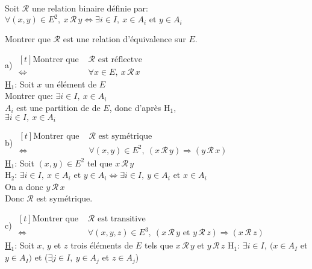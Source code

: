 \documentclass[12pt,twoside,a4paper]{article}
\begin{document}
		\begin{preuve}
			Soit $\mathcal{R}$ une relation binaire d\'efinie par:\\
			$\forall(x,y)\in E^2,\ x\,\mathcal{R}\,y\iff\exists i\in I,\ x\in A_i\text{ et }y\in A_i$
			\begin{liste}
				\item[\cercle{1}] Montrer que $\mathcal{R}$ est une relation d'\'equivalence sur $E$.\\
				\begin{liste}
					\item[a)] $\begin{aligned}[t]\text{Montrer que }&\mathcal{R}\text{ est r\'eflectve}\\
						\iff&\forall x\in E,\ x\,\mathcal{R}\,x\end{aligned}$\\
						\underline{H$_1$}: Soit $x$ un \'el\'ement de $E$\\
						Montrer que: $\exists i\in I,\ x\in A_i$\\
						$A_i$ est une partition de de $E$, donc d'apr\`es H$_1$,\\
						$\exists i\in I,\ x\in A_i$
					\item[b)]  $\begin{aligned}[t]\text{Montrer que }&\mathcal{R}\text{ est sym\'etrique}\\
						\iff&\forall (x,y)\in E^2,\ (x\,\mathcal{R}\,y)\Rightarrow(y\,\mathcal{R}\,x)\end{aligned}$\\
						\underline{H$_1$}: Soit $(x,y)\in E^2$ tel que $x\,\mathcal{R}\,y$\\
						H$_2$: $\exists i\in I,\ x\in A_i\text{ et }y\in A_i\iff\exists i\in I,\ y\in A_i \text{ et } x\in A_i$\\
						On a donc $y\,\mathcal{R}\,x$\\
						Donc $\mathcal{R}$ est sym\'etrique.
					\item[c)] $\begin{aligned}[t]\text{Montrer que }&\mathcal{R}\text{ est transitive}\\
						\iff&\forall (x,y,z)\in E^3,\ (x\,\mathcal{R}\,y\text{ et }y\,\mathcal{R}\,z)\Rightarrow(x\,\mathcal{R}\,z)\end{aligned}$\\
						\underline{H$_1$}: Soit $x$, $y$ et $z$ trois \'el\'ements de $E$ tels que $x\,\mathcal{R}\,y$ et $y\,\mathcal{R}\,z$
						H$_1$: $\exists i\in I,\ (x\in A_I$ et $y\in A_I)$ et ($\exists j\in I,\ y\in A_j$ et $z\in A_j$)\\

\end{liste}
\end{liste}
\end{preuve}
\end{document}

